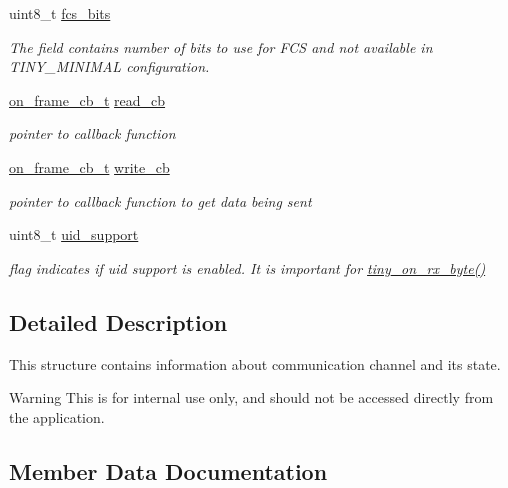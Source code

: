 \begin{DoxyCompactItemize}
uint8\+\_\+t \hyperlink{structSTinyData_a3cf4d6009cc472630e20a68d6fa50186}{fcs\+\_\+bits}
\begin{DoxyCompactList}\small\item\em The field contains number of bits to use for F\+CS and not available in T\+I\+N\+Y\+\_\+\+M\+I\+N\+I\+M\+AL configuration. \end{DoxyCompactList}\item 
\hyperlink{tiny__proto__types_8h_ad6bf709565b8aecb9e6ecf196f219d54}{on\+\_\+frame\+\_\+cb\+\_\+t} \hyperlink{structSTinyData_a31ba50154472c11e0d063b0aeef95f4d}{read\+\_\+cb}
\begin{DoxyCompactList}\small\item\em pointer to callback function \end{DoxyCompactList}\item 
\hyperlink{tiny__proto__types_8h_ad6bf709565b8aecb9e6ecf196f219d54}{on\+\_\+frame\+\_\+cb\+\_\+t} \hyperlink{structSTinyData_ada334c88e86bfd2c10191f65818c3fb3}{write\+\_\+cb}
\begin{DoxyCompactList}\small\item\em pointer to callback function to get data being sent \end{DoxyCompactList}\item 
\mbox{\label{structSTinyData_aa004bdc7db38cbbef4df4a4d94ca6a4b}} 
uint8\+\_\+t \hyperlink{structSTinyData_aa004bdc7db38cbbef4df4a4d94ca6a4b}{uid\+\_\+support}
\begin{DoxyCompactList}\small\item\em flag indicates if uid support is enabled. It is important for \hyperlink{group__ADVANCED__API_gaaf9bf6423bd0b8388c3387225b805278}{tiny\+\_\+on\+\_\+rx\+\_\+byte()} \end{DoxyCompactList}\end{DoxyCompactItemize}


\subsection{Detailed Description}
This structure contains information about communication channel and its state. \begin{DoxyWarning}{Warning}
This is for internal use only, and should not be accessed directly from the application. 
\end{DoxyWarning}


\subsection{Member Data Documentation}
\mbox{\label{structSTinyData_a31ba50154472c11e0d063b0aeef95f4d}} 
